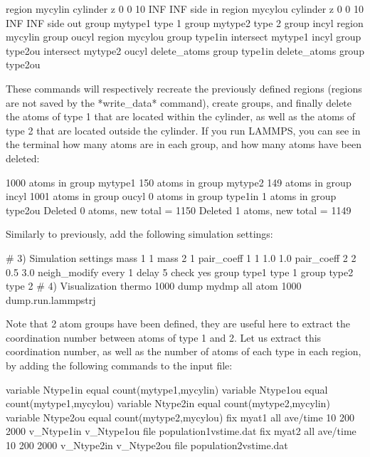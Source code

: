 \begin{lcverbatim}
region mycylin cylinder z 0 0 10 INF INF side in
region mycylou cylinder z 0 0 10 INF INF side out
group mytype1 type 1
group mytype2 type 2
group incyl region mycylin
group oucyl region mycylou
group type1in intersect mytype1 incyl
group type2ou intersect mytype2 oucyl
delete_atoms group type1in
delete_atoms group type2ou
\end{lcverbatim}

These commands will respectively recreate
the previously defined regions (regions are not saved by the
*write_data* command), create groups, and finally delete the
atoms of type 1 that are located within the cylinder, as
well as the atoms of type 2 that are located outside the
cylinder. If you run LAMMPS, you can see in the terminal how
many atoms are in each group, and how many atoms have been
deleted:

\begin{lcverbatim}
1000 atoms in group mytype1
150 atoms in group mytype2
149 atoms in group incyl
1001 atoms in group oucyl
0 atoms in group type1in
1 atoms in group type2ou
Deleted 0 atoms, new total = 1150
Deleted 1 atoms, new total = 1149
\end{lcverbatim}

Similarly to previously, add the following simulation
settings:

\begin{lcverbatim}
# 3) Simulation settings
mass 1 1
mass 2 1
pair_coeff 1 1 1.0 1.0
pair_coeff 2 2 0.5 3.0
neigh_modify every 1 delay 5 check yes
group type1 type 1
group type2 type 2
# 4) Visualization
thermo 1000
dump mydmp all atom 1000 dump.run.lammpstrj
\end{lcverbatim}

Note that 2 atom groups have been defined, they are useful
here to extract the coordination number between atoms of
type 1 and 2. Let us extract this coordination number, as
well as the number of atoms of each type in each region, by
adding the following commands to the input file:

\begin{lcverbatim}
variable Ntype1in equal count(mytype1,mycylin)
variable Ntype1ou equal count(mytype1,mycylou)
variable Ntype2in equal count(mytype2,mycylin)
variable Ntype2ou equal count(mytype2,mycylou)
fix myat1 all ave/time 10 200 2000 v_Ntype1in v_Ntype1ou file population1vstime.dat
fix myat2 all ave/time 10 200 2000 v_Ntype2in v_Ntype2ou file population2vstime.dat
\end{lcverbatim}


